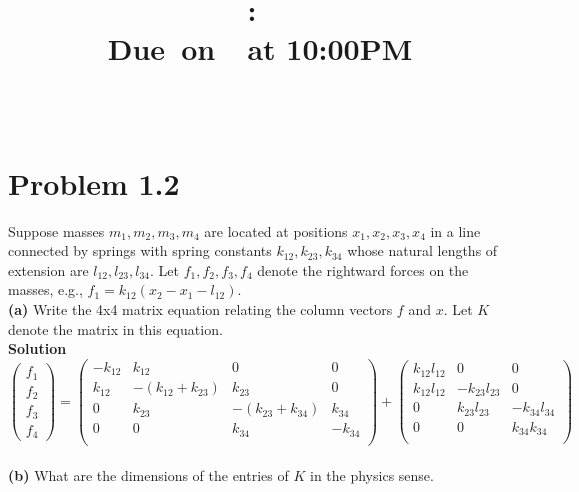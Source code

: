 \documentclass{article}
\title{
    \vspace{2in}
    \textmd{\textbf{\hmwkClass:\ \hmwkTitle}}\\
    \normalsize\vspace{0.1in}\small{Due\ on\ \hmwkDueDate\ at 10:00PM}\\
    \vspace{0.1in}\large{\textit{\hmwkClassInstructor\ \hmwkClassTime}}
    \vspace{3in}
}
\author{\hmwkAuthorName}
\date{}
\newcommand{\enterProblemHeader}[1]{
    \nobreak\extramarks{}{Problem \arabic{#1} continued on next page\ldots}\nobreak{}
    \nobreak\extramarks{Problem \arabic{#1} (continued)}{Problem \arabic{#1} continued on next page\ldots}\nobreak{}
}
\newcommand{\exitProblemHeader}[1]{
    \nobreak\extramarks{Problem \arabic{#1} (continued)}{Problem \arabic{#1} continued on next page\ldots}\nobreak{}
    \stepcounter{#1}
    \nobreak\extramarks{Problem \arabic{#1}}{}\nobreak{}
}
\newcounter{partCounter}
\newcounter{homeworkProblemCounter}
\newenvironment{homeworkProblem}[1][-1]{
    \ifnum#1>0
        \setcounter{homeworkProblemCounter}{#1}
    \fi
    \section{Problem \arabic{homeworkProblemCounter}}
    \setcounter{partCounter}{1}
    \enterProblemHeader{homeworkProblemCounter}
}{
    \exitProblemHeader{homeworkProblemCounter}
}
\begin{document}
\maketitle

\pagebreak
\section*{Problem 1.2}
    Suppose masses $m_1, m_2, m_3, m_4$ are located at positions $x_1, x_2, x_3, x_4$ in a line connected by springs with spring constants $k_{12}, k_{23}, k_{34}$ whose natural lengths of extension are $l_{12}, l_{23}, l_{34}$. Let $f_1, f_2, f_3, f_4$ denote the rightward forces on the masses, e.g., $f_1 = k_{12}(x_2 - x_1 - l_{12})$. \\
    
    \textbf{(a)} Write the 4x4 matrix equation relating the column vectors $f$ and $x$. Let $K$ denote the matrix in this equation.\\

    \textbf{Solution}
    \[
    \begin{pmatrix}
        f_1 \\
        f_2 \\
        f_3 \\
        f_4
    \end{pmatrix}
    =
    \begin{pmatrix}
        -k_{12} & k_{12} & 0 & 0\\
        k_{12} & -(k_{12} + k_{23}) & k_{23} & 0\\
        0 & k_{23} & -(k_{23} + k_{34}) & k_{34}\\
        0 & 0 & k_{34} & -k_{34}\\
    \end{pmatrix}
        +
    \begin{pmatrix}
        k_{12}l_{12} & 0 & 0 \\
        k_{12}l_{12} & -k_{23}l_{23} & 0\\
        0 & k_{23}l_{23} & -k_{34}l_{34}  \\
        0 & 0 & k_{34}k_{34}\\
    \end{pmatrix}   
    \]
    \\

    \textbf{(b)} What are the dimensions of the entries of $K$ in the physics sense.\\
    
\end{document}
